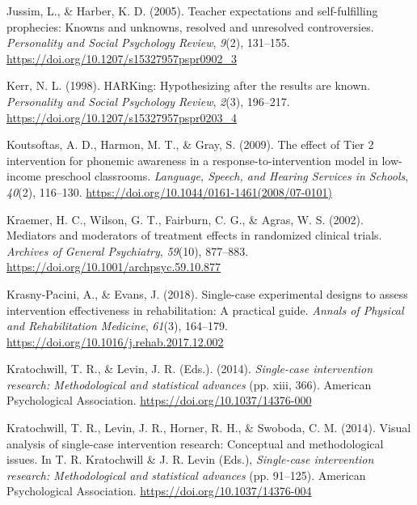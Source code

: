 \documentclass{krantz}
\newlength{\cslhangindent}
\newlength{\cslentryspacingunit} %
\newenvironment{CSLReferences}[2] %
{%
\setlength{\parindent}{0pt}
\ifodd #1
\let\oldpar\par
\def\par{\hangindent=\cslhangindent\oldpar}
\fi
\setlength{\parskip}{#2\cslentryspacingunit}
}%
{}
\begin{document}
\begin{CSLReferences}{1}{0}
\leavevmode{}%
Jussim, L., \& Harber, K. D. (2005). Teacher expectations and self-fulfilling prophecies: Knowns and unknowns, resolved and unresolved controversies. \emph{Personality and Social Psychology Review}, \emph{9}(2), 131--155. \url{https://doi.org/10.1207/s15327957pspr0902_3}

\leavevmode{}%
Kerr, N. L. (1998). {HARKing}: Hypothesizing after the results are known. \emph{Personality and Social Psychology Review}, \emph{2}(3), 196--217. \url{https://doi.org/10.1207/s15327957pspr0203_4}

\leavevmode{}%
Koutsoftas, A. D., Harmon, M. T., \& Gray, S. (2009). The effect of {Tier} 2 intervention for phonemic awareness in a response-to-intervention model in low-income preschool classrooms. \emph{Language, Speech, and Hearing Services in Schools}, \emph{40}(2), 116--130. \url{https://doi.org/10.1044/0161-1461(2008/07-0101)}

\leavevmode{}%
Kraemer, H. C., Wilson, G. T., Fairburn, C. G., \& Agras, W. S. (2002). Mediators and moderators of treatment effects in randomized clinical trials. \emph{Archives of General Psychiatry}, \emph{59}(10), 877--883. \url{https://doi.org/10.1001/archpsyc.59.10.877}

\leavevmode{}%
Krasny-Pacini, A., \& Evans, J. (2018). Single-case experimental designs to assess intervention effectiveness in rehabilitation: {A} practical guide. \emph{Annals of Physical and Rehabilitation Medicine}, \emph{61}(3), 164--179. \url{https://doi.org/10.1016/j.rehab.2017.12.002}

\leavevmode{}%
Kratochwill, T. R., \& Levin, J. R. (Eds.). (2014). \emph{Single-case intervention research: {Methodological} and statistical advances} (pp. xiii, 366). {American Psychological Association}. \url{https://doi.org/10.1037/14376-000}

\leavevmode{}%
Kratochwill, T. R., Levin, J. R., Horner, R. H., \& Swoboda, C. M. (2014). Visual analysis of single-case intervention research: {Conceptual} and methodological issues. In T. R. Kratochwill \& J. R. Levin (Eds.), \emph{Single-case intervention research: {Methodological} and statistical advances} (pp. 91--125). {American Psychological Association}. \url{https://doi.org/10.1037/14376-004}


\end{CSLReferences}
\end{document}
